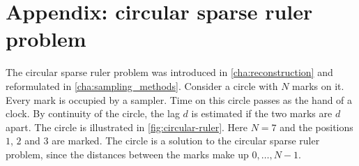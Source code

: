 \documentclass[a4paper, openany, oneside]{memoir}
\begin{document}
\section{Appendix: circular sparse ruler problem}

The circular sparse ruler problem was introduced in \cref{cha:reconstruction} and reformulated in \cref{cha:sampling_methods}. Consider a circle with $N$ marks on it. Every mark is occupied by a sampler. Time on this circle passes as the hand of a clock. By continuity of the circle, the lag $d$ is estimated if the two marks are $d$ apart. The circle is illustrated in \cref{fig:circular-ruler}. Here $N=7$ and the positions $1$, $2$ and $3$ are marked. The circle is a solution to the circular sparse ruler problem, since the distances between the marks make up $0,\ldots,N-1$.
\end{document}
